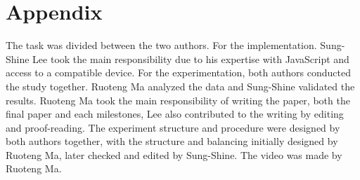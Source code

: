 \documentclass{sigchi}
\begin{document}
\balance{}




\section{Appendix}
The task was divided between the two authors. For the implementation. Sung-Shine Lee took the main responsibility due to his expertise with JavaScript and access to a compatible device. For the experimentation, both authors conducted the study together. Ruoteng Ma analyzed the data and Sung-Shine validated the results. Ruoteng Ma took the main responsibility of writing the paper, both the final paper and each milestones, Lee also contributed to the writing by editing and proof-reading. The experiment structure and procedure were designed by both authors together, with the structure and balancing initially designed by Ruoteng Ma, later checked and edited by Sung-Shine. The video was made by Ruoteng Ma.  
\end{document}
